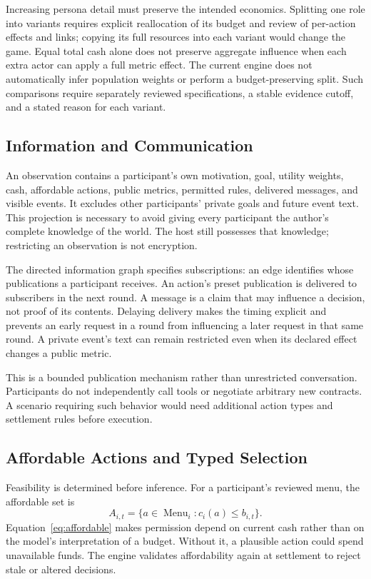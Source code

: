 Increasing persona detail must preserve the intended economics. Splitting one
role into variants requires explicit reallocation of its budget and review of
per-action effects and links; copying its full resources into each variant
would change the game. Equal total cash alone does not preserve aggregate
influence when each extra actor can apply a full metric effect. The current
engine does not automatically infer population weights or perform a
budget-preserving split. Such comparisons require separately reviewed
specifications, a stable evidence cutoff, and a stated reason for each variant.

\subsection{Information and Communication}
An observation contains a participant's own motivation, goal, utility weights,
cash, affordable actions, public metrics, permitted rules, delivered messages,
and visible events. It excludes other participants' private goals and future
event text. This projection is necessary to avoid giving every participant
the author's complete knowledge of the world. The host still possesses that
knowledge; restricting an observation is not encryption.

The directed information graph specifies subscriptions: an edge identifies
whose publications a participant receives. An action's preset publication is
delivered to subscribers in the next round. A message is a claim that may
influence a decision, not proof of its contents. Delaying delivery makes the
timing explicit and prevents an early request in a round from influencing a
later request in that same round. A private event's text can remain restricted
even when its declared effect changes a public metric.

This is a bounded publication mechanism rather than unrestricted conversation.
Participants do not independently call tools or negotiate arbitrary new
contracts. A scenario requiring such behavior would need additional action
types and settlement rules before execution.

\subsection{Affordable Actions and Typed Selection}
Feasibility is determined before inference. For a participant's reviewed menu,
the affordable set is
\begin{equation}
A_{i,t}=\{a\in\operatorname{Menu}_i:c_i(a)\leq b_{i,t}\}.
\label{eq:affordable}
\end{equation}
Equation~\eqref{eq:affordable} makes permission depend on current cash rather
than on the model's interpretation of a budget. Without it, a plausible action
could spend unavailable funds. The engine validates affordability again at
settlement to reject stale or altered decisions.

